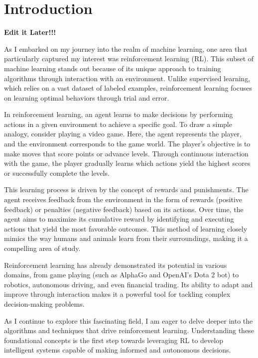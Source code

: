 \section{Introduction}
\begin{center}
    \textbf{\Huge{Edit it Later!!!}}
\end{center}

As I embarked on my journey into the realm of machine learning, one area that particularly captured my interest was reinforcement learning (RL). This subset of machine learning stands out because of its unique approach to training algorithms through interaction with an environment. Unlike supervised learning, which relies on a vast dataset of labeled examples, reinforcement learning focuses on learning optimal behaviors through trial and error.

In reinforcement learning, an agent learns to make decisions by performing actions in a given environment to achieve a specific goal. To draw a simple analogy, consider playing a video game. Here, the agent represents the player, and the environment corresponds to the game world. The player's objective is to make moves that score points or advance levels. Through continuous interaction with the game, the player gradually learns which actions yield the highest scores or successfully complete the levels.

This learning process is driven by the concept of rewards and punishments. The agent receives feedback from the environment in the form of rewards (positive feedback) or penalties (negative feedback) based on its actions. Over time, the agent aims to maximize its cumulative reward by identifying and executing actions that yield the most favorable outcomes. This method of learning closely mimics the way humans and animals learn from their surroundings, making it a compelling area of study.

Reinforcement learning has already demonstrated its potential in various domains, from game playing (such as AlphaGo and OpenAI's Dota 2 bot) to robotics, autonomous driving, and even financial trading. Its ability to adapt and improve through interaction makes it a powerful tool for tackling complex decision-making problems.

As I continue to explore this fascinating field, I am eager to delve deeper into the algorithms and techniques that drive reinforcement learning. Understanding these foundational concepts is the first step towards leveraging RL to develop intelligent systems capable of making informed and autonomous decisions.